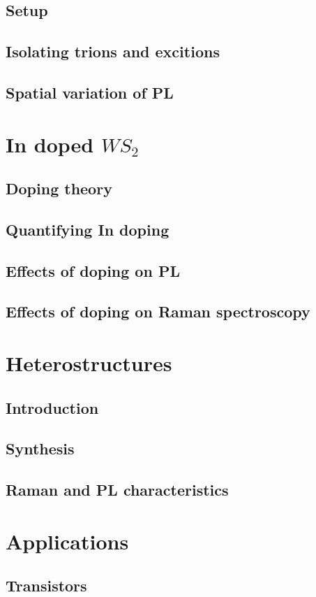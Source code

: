 \documentclass[12pt]{article}
\begin{document}
{	\subsection{Setup}
	\subsection{Isolating trions and excitions}
	\subsection{Spatial variation of PL}
\section{In doped $WS_2$}
	\subsection{Doping theory}
	\subsection{Quantifying In doping}
	\subsection{Effects of doping on PL}
	\subsection{Effects of doping on Raman spectroscopy}
\section{Heterostructures}
	\subsection{Introduction}
	\subsection{Synthesis}
	\subsection{Raman and PL characteristics}
\section{Applications}
	\subsection{Transistors}
}
\end{document}
